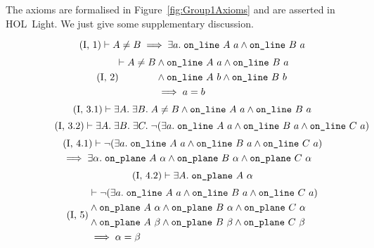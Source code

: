The axioms are formalised in Figure~\ref{fig:Group1Axioms} and are asserted in HOL~Light. We just give some supplementary discussion.

\begin{figure}
\begin{equation}\label{eq:g11}
  \tag{I,~1}
    \vdash A \neq B \implies \exists a.\; \texttt{on\_line}\ A\ a \wedge \texttt{on\_line}\ B\ a
\end{equation}
\begin{equation}\label{eq:g12}
  \tag{I,~2}
  \begin{split}
    \vdash A \neq B &\wedge \texttt{on\_line}\ A\ a \wedge \texttt{on\_line}\ B\ a\\
    &\wedge \texttt{on\_line}\ A\ b \wedge \texttt{on\_line}\ B\ b\\
    &\implies a = b
  \end{split}
\end{equation}
\begin{equation}\label{eq:g13a}
  \tag{I,~3.1}
  \vdash \exists A.\;\exists B.\; A \neq B \wedge \texttt{on\_line}\ A\ a \wedge \texttt{on\_line}\ B\ a
\end{equation}
\begin{equation}\label{eq:g13b}  \tag{I,~3.2}
  \vdash\exists A.\;\exists B.\;\exists C.\; \neg(\exists a.\; \texttt{on\_line}\ A\ a\wedge \texttt{on\_line}\ B\ a\wedge \texttt{on\_line}\ C\ a)
\end{equation}
\begin{multline}\label{eq:g14a}
  \tag{I,~4.1}
  \vdash\neg(\exists a.\; \texttt{on\_line}\ A\ a\wedge \texttt{on\_line}\ B\ a\wedge \texttt{on\_line}\ C\ a)\\\quad \implies \exists \alpha.\; \texttt{on\_plane}\ A\ \alpha \wedge \texttt{on\_plane}\ B\ \alpha \wedge \texttt{on\_plane}\ C\ \alpha
\end{multline}
\begin{equation}\label{eq:g14b}
  \tag{I,~4.2}
  \vdash\exists A.\; \texttt{on\_plane}\ A\ \alpha
\end{equation}
\begin{equation}\label{eq:g15}
  \tag{I,~5}
  \begin{split}
    &\vdash\Triangle{a}{A}{B}{C}\\
    &\wedge \code{on\_plane}\ A\ \alpha \wedge \code{on\_plane}\ B\ \alpha \wedge \code{on\_plane}\ C\ \alpha\\
    &\wedge \code{on\_plane}\ A\ \beta \wedge \code{on\_plane}\ B\ \beta \wedge \code{on\_plane}\ C\ \beta\\
    &\implies \alpha = \beta
  \end{split}
\end{equation}
\begin{equation}\label{eq:g16}

\end{equation}
\end{figure}
